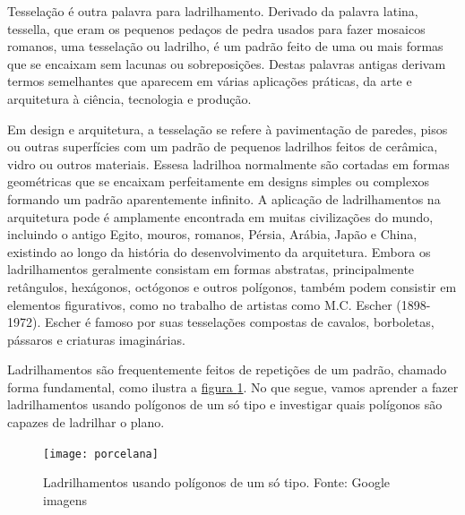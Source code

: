  \label{tess}

Tesselação é outra palavra para ladrilhamento. Derivado da palavra latina, tessella, que eram os pequenos pedaços de pedra usados para fazer mosaicos romanos, uma tesselação ou ladrilho, é um padrão feito de uma ou mais formas que se encaixam sem lacunas ou sobreposições.
Destas palavras antigas derivam termos semelhantes que aparecem em várias aplicações práticas, da arte e arquitetura à ciência, tecnologia e produção.

Em design e arquitetura, a tesselação se refere à pavimentação de paredes, pisos ou outras superfícies com um padrão de pequenos ladrilhos feitos de cerâmica, vidro ou outros materiais. Essesa ladrilhoa normalmente são cortadas em formas geométricas que se encaixam perfeitamente em designs simples ou complexos formando um padrão aparentemente infinito. A aplicação de ladrilhamentos  na arquitetura pode é  amplamente encontrada em muitas civilizações do mundo, incluindo o antigo Egito, mouros, romanos, Pérsia, Arábia, Japão e China, existindo ao longo da história do desenvolvimento da arquitetura. Embora os ladrilhamentos geralmente consistam em formas abstratas, principalmente retângulos, hexágonos, octógonos e outros polígonos, também podem consistir em elementos figurativos, como no trabalho de artistas como M.C. Escher (1898-1972). Escher é famoso por suas tesselações compostas de cavalos, borboletas, pássaros e criaturas imaginárias.



Ladrilhamentos são frequentemente feitos de repetições de um padrão, chamado forma fundamental, como ilustra a \hyperref[porce]{figura \ref{porce}}. No que segue, vamos aprender a fazer ladrilhamentos usando polígonos de um só tipo e investigar quais polígonos são capazes de ladrilhar o plano.

\begin{figure}[H]
\centering
\texttt{[image: porcelana]}
\caption{Ladrilhamentos usando polígonos de um só tipo. Fonte: Google imagens}
\label{porce}
\end{figure}


